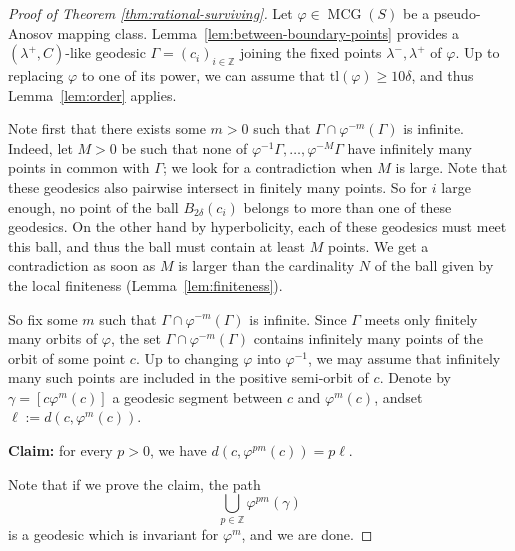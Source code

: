 \documentclass{amsart}
\newcommand{\Z}{\mathbb{Z}}
\DeclareMathOperator{\mcg}{MCG}
\newcommand{\dist}{d}
\theoremstyle{definition}
\begin{document}
\begin{proof}[Proof of Theorem \ref{thm:rational-surviving}]
Let $\varphi\in\mcg(S)$ be a pseudo-Anosov mapping class.
Lemma~\ref{lem:between-boundary-points} provides a \((\lambda^+,C)\)-like geodesic $\Gamma = (c_{i})_{i\in\Z}$ joining the fixed points $\lambda^-, \lambda^+$ of $\varphi$. Up to replacing $\varphi$ to one of its power, we can assume that $\mathrm{tl}(\varphi) \geq 10 \delta$, and thus Lemma~\ref{lem:order} applies.


Note first that there exists some $m>0$ such that $\Gamma \cap \varphi^{-m}(\Gamma)$ is infinite. Indeed, let $M>0$  be such that none of $\varphi^{-1} \Gamma, \dots, \varphi^{-M} \Gamma$ have infinitely many points in common with $\Gamma$; we look for a contradiction when $M$ is large. Note that these geodesics also pairwise intersect in finitely many points. So for $i$ large enough, no point  of the ball $B_{2\delta}(c_{i})$ belongs to more than one of these geodesics. On the other hand by hyperbolicity, each of these geodesics must meet this ball, and thus the ball must contain at least $M$ points. We get a contradiction as soon as $M$ is larger than the cardinality $N$ of the ball given by the local finiteness (Lemma~\ref{lem:finiteness}).

So fix some $m$ such that $\Gamma \cap \varphi^{-m}(\Gamma)$ is infinite. Since $\Gamma$ meets only finitely many orbits of $\varphi$, the set $\Gamma \cap \varphi^{-m}(\Gamma)$ contains infinitely many points of the orbit of some point $c$. Up to changing $\varphi$ into $\varphi^{-1}$, we may assume that infinitely many such points are included in the positive semi-orbit of $c$. Denote by $\gamma = [c \varphi^m (c)]$ a geodesic segment between \(c\) and \(\varphi^m(c)\), andset  $\ell := \dist(c, \varphi^m (c))$.

\textbf{Claim:} for every $p>0$, we have $\dist(c, \varphi^{pm} (c)) = p\ell$. 

Note that if we prove the claim, the path \[
\bigcup_{p \in \mathbb{Z}} \varphi^{pm} (\gamma)
\]
is a geodesic which is invariant for $\varphi^m$, and we are done.


\end{proof}
\end{document}
